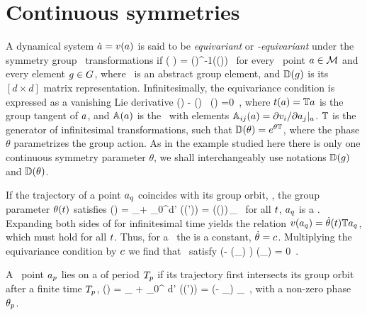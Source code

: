 \section{Continuous symmetries}
\label{s:symm}

A dynamical system $\dot{a}={v}(a)$ is said to be
\emph{equivariant} or \emph{\Group-equivariant} under the
symmetry group \Group\ transformations if
                                                \toCB
\beq
	\vel( \ssp )
    =  \matrixRep(\LieEl)^{-1}\vel(\matrixRep(\LieEl)\ssp)
	\,
for every \statesp\ point $a \in {\cal M}$ and every element $g \in
G$, where \LieEl\ is an abstract group element, and
$\mathbb{D}(g)$ is its $[d\!\times\!d]$ matrix representation.
Infinitesimally, the equivariance condition  is expressed as
a vanishing Lie derivative
                                                \toCB
\beq
  \Lg\vel(\ssp)  - \Mvar(\ssp) \, \groupTan(\ssp) =0
  \,,
where
$ t(a) = \mathbb{T} a $ is the group tangent of $a$,
and $\mathbb{A}(a)$ is the \stabmat\, with elements
$\mathbb{A}_{ij}(a)={\partial {v}_i}/{\partial a_j}|_{a}$.
$\mathbb{T}$ is the generator of infinitesimal transformations, such that
$\mathbb{D}(\theta) = e^{\theta\mathbb{T}}$, where the phase $\theta$
parametrizes the group action. As in the example studied here there is
only one continuous symmetry parameter $\theta$, we shall interchangeably
use notations $\mathbb{D}(g)$ and $\mathbb{D}(\theta)$.


If the trajectory of a point $a_q$ coincides with its group
orbit, \ie, the group parameter $\theta (t)$ satisfies
\beq
\ssp (\zeit)
    = \ssp_\stagn + \int_0^\zeit \!\!d\zeit' \vel(\ssp (\zeit'))
    = \LieEl (\theta (\zeit))\,\ssp_\stagn
  \,
for all $t$, $a_q$ is a \emph{\reqv}. Expanding
both sides of  for infinitesimal time yields the
relation ${v}(a_q) = \dot{\theta}(t) \mathbb{T} a_q$, which
must hold for all $t$. Thus, for a \reqv\ the  \emph{\phaseVel}
is a constant, $\dot{\theta} = c$. Multiplying the equivariance condition
 by $c$ we find that \reqva\ satisfy
\beq
(\velRel \Lg - \Mvar (\ssp_\stagn) ) \vel (\ssp_\stagn) = 0
\,.

A \statesp\ point $a_{p}$ lies on a \emph{\rpo} of period
${T_{p}}$ if its trajectory first intersects its group orbit after
a finite time ${T_{p}}$,
\beq
\ssp(\period{\rpprime})
    = \ssp_\rpprime
     + \int_0^\period{\rpprime} \!\!\!d\tau' \vel(\ssp (\tau'))
    = \LieEl (- \theta_\rpprime ) \ssp_\rpprime
  \,,
with a non-zero phase $\theta_{p}$.

